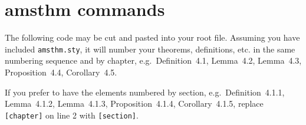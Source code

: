 
\chapter{amsthm commands}
\label{amsthmcommands}

The following code may be cut and pasted into your root file. Assuming you have included \verb"amsthm.sty", it will number your theorems, definitions, etc. in the same numbering sequence and by chapter, e.g.~Definition~4.1, Lemma~4.2, Lemma~4.3, Proposition~4.4, Corollary~4.5.

If you prefer to have the elements numbered by section, e.g.~Definition~4.1.1, Lemma~4.1.2, Lemma~4.1.3, Proposition~4.1.4, Corollary~4.1.5, replace \verb"[chapter]" on line 2 with \verb"[section]".

\begin{smallverbatim}

  \theoremstyle{plain}%
  \newtheorem{theorem}{Theorem}[chapter]
  \newtheorem{lemma}[theorem]{Lemma}
  \newtheorem{corollary}[theorem]{Corollary}
  \newtheorem{proposition}[theorem]{Proposition}
  \newtheorem{conjecture}[theorem]{Conjecture}
  \newtheorem{criterion}[theorem]{Criterion}
  \newtheorem{algorithm}[theorem]{Algorithm}

  \theoremstyle{definition}
  \newtheorem{definition}[theorem]{Definition}
  \newtheorem{condition}[theorem]{Condition}

  \theoremstyle{remark}
  \newtheorem{remark}[theorem]{Remark}
  \newtheorem{note}[theorem]{Note}
  \newtheorem{notation}[theorem]{Notation}
  \newtheorem{claim}[theorem]{Claim}
  \newtheorem{summary}[theorem]{Summary}
  \newtheorem{acknowledgement}[theorem]{Acknowledgement}
  \newtheorem{case}[theorem]{Case}
  \newtheorem{conclusion}[theorem]{Conclusion}
\end{smallverbatim}

\endinput